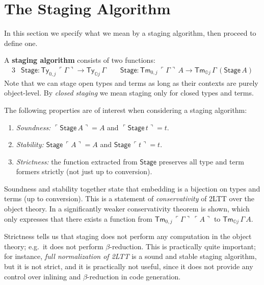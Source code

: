\documentclass[acmsmall,screen]{acmart}
\newcommand{\msf}[1]{\mathsf{#1}}
\newcommand{\mbb}[1]{\mathbb{#1}}
\newcommand{\mbbo}{\mbb{O}}
\newcommand{\Ty}{\msf{Ty}}
\newcommand{\Tm}{\msf{Tm}}
\newcommand{\emb}[1]{\ulcorner#1\urcorner}
\newcommand{\Stage}{\msf{Stage}}
\theoremstyle{remark}
\begin{document}
\section{The Staging Algorithm}\label{sec:staging-algorithm}

In this section we specify what we mean by a staging algorithm, then proceed to
define one.

\begin{definition}\label{def:staging}
A \textbf{staging algorithm} consists of two functions:
  \begin{alignat*}{3}
    & \Stage : \Ty_{0,j}\,\emb{\Gamma} \to \Ty_{\mbbo j}\,\Gamma\hspace{2em} \Stage : \Tm_{0,j}\,\emb{\Gamma}\,A \to \Tm_{\mbbo j}\,\Gamma\,(\Stage\,A)
  \end{alignat*}
Note that we can stage open types and terms as long as their contexts are purely
object-level. By \emph{closed staging} we mean staging only for closed types and
terms.
\end{definition}
\begin{definition}
  The following properties are of interest when considering a staging algorithm:
  \begin{enumerate}
  \item \emph{Soundness:} $\emb{\Stage\,A} = A$ and $\emb{\Stage\,t} = t$.
  \item \emph{Stability:} $\Stage\,\emb{A} = A$ and $\Stage\,\emb{t} = t$.
  \item \emph{Strictness:} the function extracted from $\Stage$ preserves all
    type and term formers strictly (not just up to conversion).
  \end{enumerate}
\end{definition}

Soundness and stability together state that embedding is a bijection
on types and terms (up to conversion). This is a statement of
\emph{conservativity} of 2LTT over the object theory. In \cite{twolevel} a
significantly weaker conservativity theorem is shown, which only expresses that
there exists a function from $\Tm_{0,j}\,\emb{\Gamma}\,\emb{A}$ to $\Tm_{\mbbo
  j}\,\Gamma\,A$.

Strictness tells us that staging does not perform any computation in the object
theory; e.g.\ it does not perform $\beta$-reduction. This is practically quite
important; for instance, \emph{full normalization of 2LTT} is a sound and stable
staging algorithm, but it is not strict, and it is practically not useful, since
it does not provide any control over inlining and $\beta$-reduction in code
generation.
\end{document}
